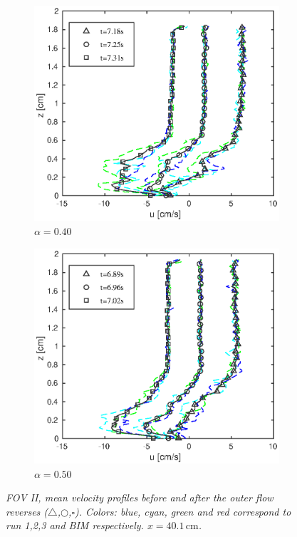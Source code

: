 \documentclass[review, authoryear]{elsarticle}
\newcommand{\cm}{\,\mbox{cm}}
\begin{document}
\begin{figure}[]
{\begin{subfigure}[b]{.3\textwidth}
\centering
\includegraphics[width=.95\textwidth]{./Figures/FOV_4/case40_sept2015.eps}
\caption{\textit{$\alpha=0.40$}}
\end{subfigure}%
\begin{subfigure}[b]{.3\textwidth}
\centering
\includegraphics[width=.95\textwidth]{./Figures/FOV_4/case50_sept2015.eps}
\caption{\textit{$\alpha=0.50$}}
\end{subfigure}%
}
\caption{ \textit{FOV II, mean velocity profiles before and after the outer flow reverses ($\triangle$,$\bigcirc$,$\square$). Colors: blue, cyan, green and red correspond to run 1,2,3 and BIM respectively.  $x=40.1\cm$. } }
\label{fig:PIV_FOV4}
\end{figure}
\end{document}
